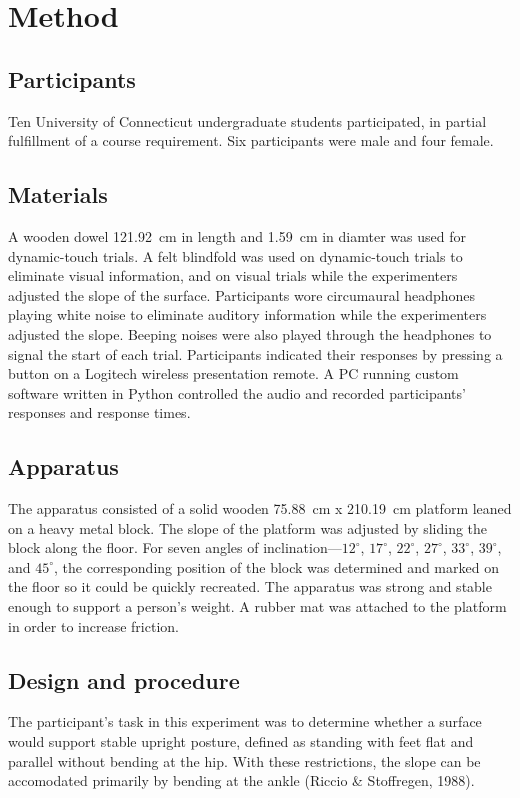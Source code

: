\documentclass{article}
\begin{document}
\section{Method}
\subsection{Participants}
Ten University of Connecticut undergraduate students participated, in partial fulfillment of a course requirement. Six participants were male and four female.

\subsection{Materials}
A wooden dowel 121.92~cm in length and 1.59~cm in diamter was used for dynamic-touch trials. A felt blindfold was used on dynamic-touch trials to eliminate visual information, and on visual trials while the experimenters adjusted the slope of the surface. Participants wore circumaural headphones playing white noise to eliminate auditory information while the experimenters adjusted the slope. Beeping noises were also played through the headphones to signal the start of each trial.  Participants indicated their responses by pressing a button on a Logitech wireless presentation remote. A PC running custom software written in Python controlled the audio and recorded participants' responses and response times.

\subsection{Apparatus}
The apparatus consisted of a solid wooden 75.88~cm x 210.19~cm platform leaned on a heavy metal block. The slope of the platform was adjusted by sliding the block along the floor. For seven angles of inclination---$12^\circ$, $17^\circ$, $22^\circ$, $27^\circ$, $33^\circ$, $39^\circ$, and $45^\circ$, the corresponding position of the block was determined and marked on the floor so it could be quickly recreated. The apparatus was strong and stable enough to support a person's weight. A rubber mat was attached to the platform in order to increase friction.

\subsection{Design and procedure}
The participant's task in this experiment was to determine whether a surface would support stable upright posture, defined as standing with feet flat and parallel without bending at the hip. With these restrictions, the slope can be accomodated primarily by bending at the ankle (Riccio \& Stoffregen, 1988). %
\end{document}
